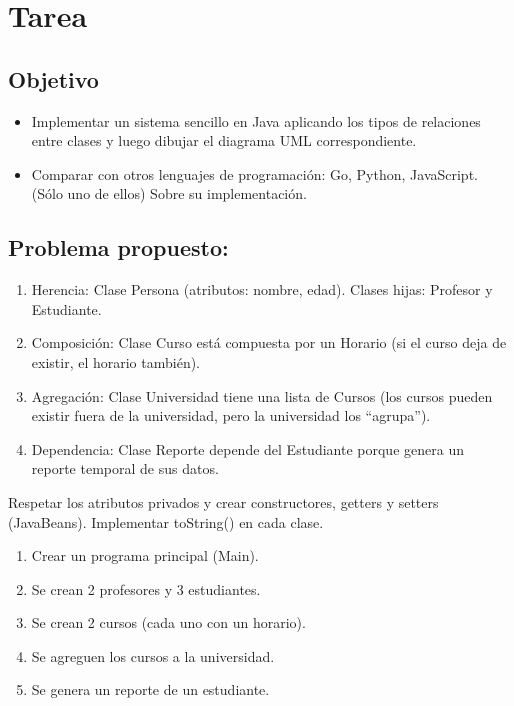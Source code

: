 \section{Tarea}

\subsection{Objetivo}

\begin{itemize}
    \item Implementar un sistema sencillo en Java aplicando los tipos de
    relaciones entre clases y luego dibujar el diagrama UML correspondiente.
    \item Comparar con otros lenguajes de programación: Go, Python,
    JavaScript. (Sólo uno de ellos) Sobre su implementación.
\end{itemize}



\subsection{Problema propuesto: }

\begin{enumerate}[label={ }]
    \item Herencia: Clase Persona (atributos: nombre, edad). Clases hijas: Profesor y Estudiante.
    \item Composición: Clase Curso está compuesta por un Horario (si el curso deja de existir, el horario también).
    \item Agregación: Clase Universidad tiene una lista de Cursos (los cursos pueden existir fuera de la universidad, pero la universidad los ``agrupa'').
    \item Dependencia: Clase Reporte depende del Estudiante porque genera un reporte temporal de sus datos.
\end{enumerate}

Respetar los atributos privados y crear constructores, getters y setters (JavaBeans). Implementar toString() en cada clase.

\begin{enumerate}[label={ }]
    \item Crear un programa principal (Main). 
    \item Se crean 2 profesores y 3 estudiantes. 
    \item Se crean 2 cursos (cada uno con un horario). 
    \item Se agreguen los cursos a la universidad. 
    \item Se genera un reporte de un estudiante.
\end{enumerate}

